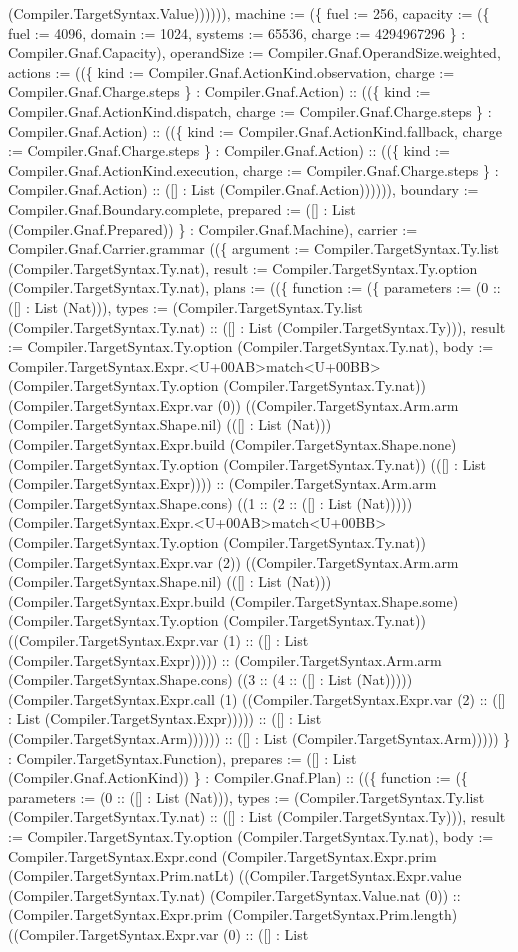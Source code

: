 \documentclass[11pt]{article}
\begin{document}
(Compiler.TargetSyntax.Value)))))), machine := (\{ fuel := 256, capacity := (\{ fuel := 4096, domain := 1024, systems := 65536, charge := 4294967296 \} : Compiler.Gnaf.Capacity), operandSize := Compiler.Gnaf.OperandSize.weighted, actions := ((\{ kind := Compiler.Gnaf.ActionKind.observation, charge := Compiler.Gnaf.Charge.steps \} : Compiler.Gnaf.Action) :: ((\{ kind := Compiler.Gnaf.ActionKind.dispatch, charge := Compiler.Gnaf.Charge.steps \} : Compiler.Gnaf.Action) :: ((\{ kind := Compiler.Gnaf.ActionKind.fallback, charge := Compiler.Gnaf.Charge.steps \} : Compiler.Gnaf.Action) :: ((\{ kind := Compiler.Gnaf.ActionKind.execution, charge := Compiler.Gnaf.Charge.steps \} : Compiler.Gnaf.Action) :: ([] : List (Compiler.Gnaf.Action)))))), boundary := Compiler.Gnaf.Boundary.complete, prepared := ([] : List (Compiler.Gnaf.Prepared)) \} : Compiler.Gnaf.Machine), carrier := Compiler.Gnaf.Carrier.grammar ((\{ argument := Compiler.TargetSyntax.Ty.list (Compiler.TargetSyntax.Ty.nat), result := Compiler.TargetSyntax.Ty.option (Compiler.TargetSyntax.Ty.nat), plans := ((\{ function := (\{ parameters := (0 :: ([] : List (Nat))), types := (Compiler.TargetSyntax.Ty.list (Compiler.TargetSyntax.Ty.nat) :: ([] : List (Compiler.TargetSyntax.Ty))), result := Compiler.TargetSyntax.Ty.option (Compiler.TargetSyntax.Ty.nat), body := Compiler.TargetSyntax.Expr.<U+00AB>match<U+00BB> (Compiler.TargetSyntax.Ty.option (Compiler.TargetSyntax.Ty.nat)) (Compiler.TargetSyntax.Expr.var (0)) ((Compiler.TargetSyntax.Arm.arm (Compiler.TargetSyntax.Shape.nil) (([] : List (Nat))) (Compiler.TargetSyntax.Expr.build (Compiler.TargetSyntax.Shape.none) (Compiler.TargetSyntax.Ty.option (Compiler.TargetSyntax.Ty.nat)) (([] : List (Compiler.TargetSyntax.Expr)))) :: (Compiler.TargetSyntax.Arm.arm (Compiler.TargetSyntax.Shape.cons) ((1 :: (2 :: ([] : List (Nat))))) (Compiler.TargetSyntax.Expr.<U+00AB>match<U+00BB> (Compiler.TargetSyntax.Ty.option (Compiler.TargetSyntax.Ty.nat)) (Compiler.TargetSyntax.Expr.var (2)) ((Compiler.TargetSyntax.Arm.arm (Compiler.TargetSyntax.Shape.nil) (([] : List (Nat))) (Compiler.TargetSyntax.Expr.build (Compiler.TargetSyntax.Shape.some) (Compiler.TargetSyntax.Ty.option (Compiler.TargetSyntax.Ty.nat)) ((Compiler.TargetSyntax.Expr.var (1) :: ([] : List (Compiler.TargetSyntax.Expr))))) :: (Compiler.TargetSyntax.Arm.arm (Compiler.TargetSyntax.Shape.cons) ((3 :: (4 :: ([] : List (Nat))))) (Compiler.TargetSyntax.Expr.call (1) ((Compiler.TargetSyntax.Expr.var (2) :: ([] : List (Compiler.TargetSyntax.Expr))))) :: ([] : List (Compiler.TargetSyntax.Arm)))))) :: ([] : List (Compiler.TargetSyntax.Arm))))) \} : Compiler.TargetSyntax.Function), prepares := ([] : List (Compiler.Gnaf.ActionKind)) \} : Compiler.Gnaf.Plan) :: ((\{ function := (\{ parameters := (0 :: ([] : List (Nat))), types := (Compiler.TargetSyntax.Ty.list (Compiler.TargetSyntax.Ty.nat) :: ([] : List (Compiler.TargetSyntax.Ty))), result := Compiler.TargetSyntax.Ty.option (Compiler.TargetSyntax.Ty.nat), body := Compiler.TargetSyntax.Expr.cond (Compiler.TargetSyntax.Expr.prim (Compiler.TargetSyntax.Prim.natLt) ((Compiler.TargetSyntax.Expr.value (Compiler.TargetSyntax.Ty.nat) (Compiler.TargetSyntax.Value.nat (0)) :: (Compiler.TargetSyntax.Expr.prim (Compiler.TargetSyntax.Prim.length) ((Compiler.TargetSyntax.Expr.var (0) :: ([] : List 
\end{document}
